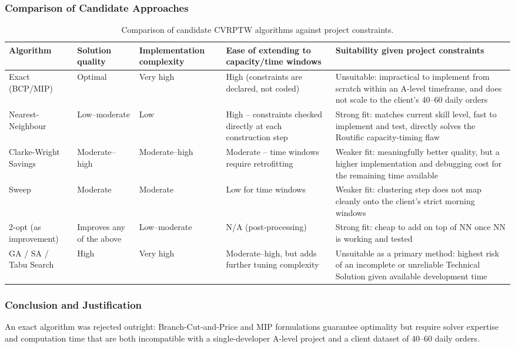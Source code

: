 \documentclass[11pt]{article}
\begin{document}
\subsubsection{Comparison of Candidate Approaches}
\begin{table}[H]
\centering
\small
\begin{tabular}{@{}L{2.6cm}L{2.6cm}L{2.6cm}L{2.6cm}L{3.4cm}@{}}
\toprule
\textbf{Algorithm} & \textbf{Solution quality} & \textbf{Implementation complexity} & \textbf{Ease of extending to capacity/time windows} & \textbf{Suitability given project constraints} \\ \midrule
Exact (BCP/MIP) & Optimal & Very high & High (constraints are declared, not coded) & Unsuitable: impractical to implement from scratch within an A-level timeframe, and does not scale to the client's 40--60 daily orders \\ \midrule
Nearest-Neighbour & Low--moderate & Low & High -- constraints checked directly at each construction step & Strong fit: matches current skill level, fast to implement and test, directly solves the Routific capacity-timing flaw \\ \midrule
Clarke-Wright Savings & Moderate--high & Moderate--high & Moderate -- time windows require retrofitting & Weaker fit: meaningfully better quality, but a higher implementation and debugging cost for the remaining time available \\ \midrule
Sweep & Moderate & Moderate & Low for time windows & Weaker fit: clustering step does not map cleanly onto the client's strict morning windows \\ -opt (as improvement) & Improves any of the above & Low--moderate & N/A (post-processing) & Strong fit: cheap to add on top of NN once NN is working and tested \\ \midrule
GA / SA / Tabu Search & High & Very high & Moderate--high, but adds further tuning complexity & Unsuitable as a primary method: highest risk of an incomplete or unreliable Technical Solution given available development time \\ \bottomrule
\end{tabular}
\caption{Comparison of candidate CVRPTW algorithms against project constraints.}
\label{tab:algorithm_comparison}
\end{table}


\subsubsection{Conclusion and Justification}
An exact algorithm was rejected outright: Branch-Cut-and-Price and MIP formulations guarantee optimality but require solver expertise and computation time that are both incompatible with a single-developer A-level project and a client dataset of 40--60 daily orders.
\end{document}
